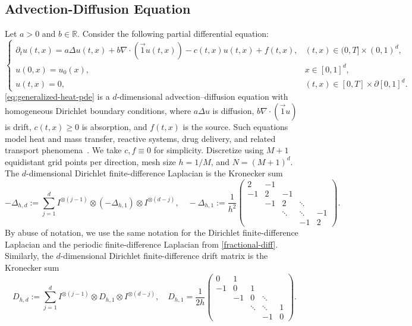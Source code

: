 \documentclass[10pt,reqno]{article}
\numberwithin{equation}{section}
\theoremstyle{plain}
\theoremstyle{definition}
\begin{document}
\subsection{Advection-Diffusion Equation}\label{generalized-heat-dirichlet}
Let \(a>0\) and \(b\in\mathbb R\). Consider the following partial differential equation: 
\begin{equation}\label{eq:generalized-heat-pde}
\begin{cases} \partial_t u(t,x) = a\Delta u(t,x) + b \nabla\cdot(\vec 1 u(t,x)) - c(t,x)u(t,x) + f(t,x), & (t,x)\in (0,T]\times (0,1)^d,\\ u(0,x)=u_0(x), & x\in [0,1]^d,\\ u(t,x)=0, & (t,x)\in[0,T]\times\partial [0,1]^d. \end{cases}
\end{equation}
\cref{eq:generalized-heat-pde} is a \(d\)-dimensional advection--diffusion equation with homogeneous Dirichlet boundary conditions, where \(a\Delta u\) is diffusion, \(b\nabla\cdot(\vec 1u)\) is drift, \(c(t,x)\geq0\) is absorption, and \(f(t,x)\) is the source. Such equations model heat and mass transfer, reactive systems, drug delivery, and related transport phenomena~\cite{ParhiziEtAlCDRS,AgudAlbesaEtAlCDR,VillotaCadenaEtAlCDRSolv,an2026fast}. We take \(c,f\equiv0\) for simplicity. Discretize using \(M+1\) equidistant grid points per direction, mesh size \(h=1/M\), and \(N=(M+1)^d\). The \(d\)-dimensional Dirichlet finite-difference Laplacian is the Kronecker sum
\begin{equation}
-\Delta_{h,d} := \sum_{j=1}^d I^{\otimes(j-1)} \otimes (-\Delta_{h,1}) \otimes I^{\otimes(d-j)}, \quad -\Delta_{h,1} := \frac{1}{h^2} \begin{pmatrix} 2 & -1 &        &        &   \\ -1 & 2 & -1     &        &   \\ & -1 & 2     & \ddots &   \\ &    & \ddots & \ddots & -1 \\ &    &        & -1     & 2 \end{pmatrix}.
\end{equation}
By abuse of notation, we use the same notation for the Dirichlet finite-difference Laplacian and the periodic finite-difference Laplacian from \cref{fractional-diff}. Similarly, the \(d\)-dimensional Dirichlet finite-difference drift matrix is the Kronecker sum
\begin{equation}
D_{h,d} := \sum_{j=1}^d I^{\otimes(j-1)} \otimes D_{h,1} \otimes I^{\otimes(d-j)}, \quad D_{h,1} = \frac{1}{2h} \begin{pmatrix} 0  & 1  &        &        &   \\ -1 & 0  & 1      &        &   \\ & -1 & 0      & \ddots &   \\ &    & \ddots & \ddots & 1 \\ &    &        & -1     & 0 \end{pmatrix}.
\end{equation}
\end{document}
